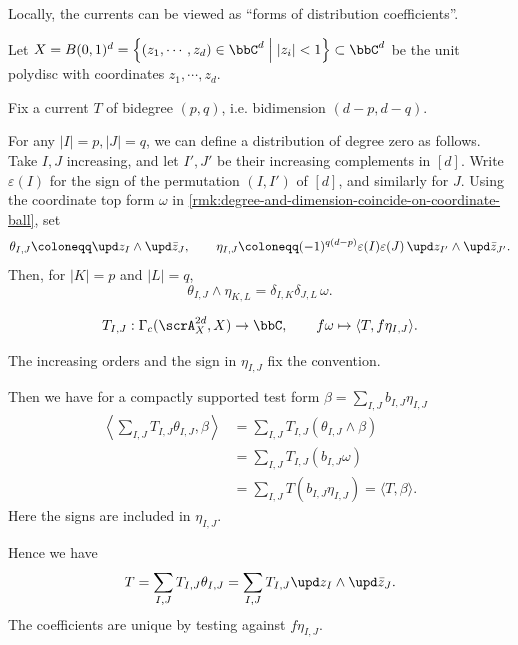 \begin{example}[label=\labelNFM{eg:currents-are-form-of-distribution-coefficients}, status=draft, tag=0000000, title={Forms of distribution coefficients}]
	Locally, the currents can be viewed as ``forms of distribution coefficients''.

	Let $X = B(0,1)^d = \left\{ (z_1,\cdots,z_d) \in \bbC^d \;\middle|\; |z_i| < 1 \right\} \subset \bbC^d$ be the unit polydisc with coordinates $z_1,\cdots,z_d$.

	Fix a current $T$ of bidegree $(p,q)$, i.e. bidimension $(d-p,d-q)$.

	For any $|I| = p,|J| = q$, we can define a distribution of degree zero as follows.
    Take $I,J$ increasing, and let $I',J'$ be their increasing complements in $[d]$.
    Write $\varepsilon(I)$ for the sign of the permutation $(I,I')$ of $[d]$, and similarly for $J$.
    Using the coordinate top form $\omega$ in \cref{rmk:degree-and-dimension-coincide-on-coordinate-ball}, set
    \[ \theta_{I,J} \coloneqq \upd z_I \wedge \upd\bar z_J, \qquad \eta_{I,J} \coloneqq (-1)^{q(d-p)}\varepsilon(I)\varepsilon(J)\,\upd z_{I'} \wedge \upd\bar z_{J'}. \]
    Then, for $|K| = p$ and $|L| = q$,
    \[ \theta_{I,J} \wedge \eta_{K,L} = \delta_{I,K}\delta_{J,L}\,\omega. \]

  \[ T_{I,J}:\Gamma_c(\scrA_X^{2d},X) \to \bbC, \qquad f\omega \mapsto \langle T,f\eta_{I,J}\rangle. \]

  The increasing orders and the sign in $\eta_{I,J}$ fix the convention.

  Then we have for a compactly supported test form $\beta = \sum_{I,J} b_{I,J}\eta_{I,J}$
  \begin{align*}
    \left\langle\sum_{I,J} T_{I,J}\theta_{I,J},\beta\right\rangle & = \sum_{I,J} T_{I,J}(\theta_{I,J}\wedge\beta) \\
    & = \sum_{I,J} T_{I,J}(b_{I,J}\omega) \\
    & = \sum_{I,J} T(b_{I,J}\eta_{I,J}) = \langle T,\beta\rangle.
  \end{align*}
  Here the signs are included in $\eta_{I,J}$.

  Hence we have
  \[ T = \sum_{I,J} T_{I,J}\theta_{I,J} = \sum_{I,J} T_{I,J} \upd z_I \wedge \upd\bar z_J. \]
  The coefficients are unique by testing against $f\eta_{I,J}$.


\end{example}
